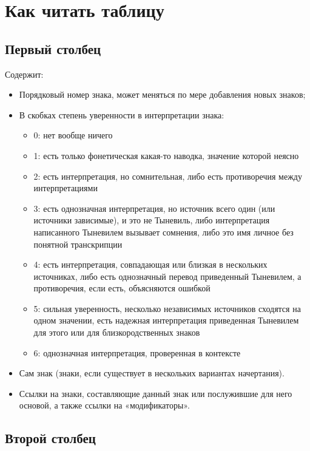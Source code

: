 \documentclass{article}
\begin{document}
\section{Как читать таблицу} 

\subsection{Первый столбец}
Содержит: 

\begin{itemize}
\item Порядковый номер знака, может меняться по мере добавления новых знаков; 
\item В скобках степень уверенности в интерпретации знака:
	\begin{itemize}
		\item 0:	нет вообще ничего
		\item 1: 	есть только фонетическая какая-то наводка, значение которой неясно
		\item 2:	есть интерпретация, но сомнительная, либо есть противоречия между интерпретациями
		\item 3:	есть однозначная интерпретация, но источник всего один (или источники зависимые), и это не Тыневиль, либо интерпретация написанного Тыневилем вызывает сомнения, либо это имя личное без понятной транскрипции
		\item 4:	есть интерпретация, совпадающая или близкая в нескольких источниках, либо есть однозначный перевод приведенный Тыневилем, а противоречия, если есть, объясняются ошибкой
		\item 5:	сильная уверенность, несколько независимых источников сходятся на одном значении, есть надежная интерпретация приведенная Тыневилем для этого или для близкородственных знаков 
		\item 6:	однозначная интерпретация, проверенная в контексте %
	\end{itemize}
\item Сам знак (знаки, если существует в нескольких вариантах начертания).
\item Ссылки на знаки, составляющие данный знак или послужившие для него основой, а также ссылки на «модификаторы».
\end{itemize}

\subsection{Второй столбец}
\end{document}
